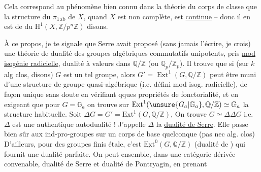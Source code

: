 Cela correspond au phénomène bien connu dans la théorie du corps de classe que la structure du $\pi_{1\,\mathrm{ab}}$ de $X$, quand $X$ est non complète, est \uline{continue} -- donc il en est de  du $\mathrm{H}^{1}(X,\mathbb{Z}/p^{n}\mathbb{Z})$ disons.

À ce propos, je te signale que Serre avait proposé (sans jamais l'écrire, je crois) une théorie de dualité des groupes algébriques commutatifs unipotents,  pris \uline{mod isogénie radicielle}, dualité à valeurs dans $\mathbb{Q}/\mathbb{Z}$ (ou $\mathbb{Q}_p/\mathbb{Z}_p$). Il trouve que si (sur $k$ alg clos, disons) $G$ est un tel groupe, alors $G'=\operatorname{Ext}^{1}(G,\mathbb{Q}/\mathbb{Z})$ peut être muni  d'une structure de groupe quasi-algébrique (i.e. défini mod isog. radicielle), de façon unique sans doute en vérifiant qques propriétés de fonctorialité, et en exigeant que pour $G=\mathbb{G}_a$ on trouve sur $\operatorname{Ext}^{1}(\unsure{G_a|\mathbb{G}_a},\mathbb{Q}/\mathbb{Z})\simeq\mathbb{G}_a$ la structure habituelle. Soit $\Delta G=G'=\underline{\mathrm{Ext}}^{1}(G,\mathbb{Q}/\mathbb{Z})$, On trouve $G\simeq\Delta\Delta G$ i.e. $\Delta$ est une authentique autodualité ! J'appelle $\Delta$ la \uline{dualité de Serre}. Elle passe bien sûr aux ind-pro-groupes sur un corps de base quelconque (pas nec alg. clos)  D'ailleurs, pour des groupes finis étale, c'est $\underline{\mathrm{Ext}}^{0}(G,\mathbb{Q}/\mathbb{Z})$ (dualité de ) qui fournit une dualité parfaite. On peut  ensemble, dans une catégorie dérivée convenable, dualité de Serre et dualité de Pontryagin, en prenant
